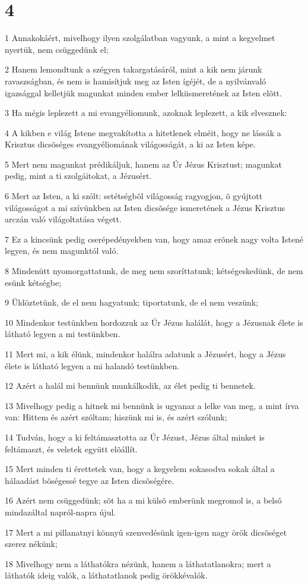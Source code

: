\chapter{4}

\par 1 Annakokáért, mivelhogy ilyen szolgálatban vagyunk, a mint a  kegyelmet nyertük, nem csüggedünk el;
\par 2 Hanem lemondtunk a szégyen takargatásáról, mint a kik nem járunk ravaszságban, és nem is hamisítjuk meg  az Isten ígéjét, de a nyilvánvaló igazsággal kelletjük magunkat minden ember lelkiismeretének az Isten elõtt.
\par 3 Ha mégis leplezett a mi evangyéliomunk, azoknak leplezett, a kik elvesznek:
\par 4 A kikben e világ Istene megvakította a hitetlenek elméit, hogy ne lássák a Krisztus dicsõséges evangyéliomának világosságát, a ki az Isten képe.
\par 5 Mert nem magunkat prédikáljuk, hanem az Úr Jézus  Krisztust; magunkat pedig, mint a ti szolgáitokat, a Jézusért.
\par 6 Mert az Isten, a ki szólt: setétségbõl világosság ragyogjon, õ gyújtott világosságot a mi  szívünkben az Isten dicsõsége ismeretének a Jézus Krisztus arczán való világoltatása végett.
\par 7 Ez a kincsünk pedig cserépedényekben van, hogy amaz erõnek nagy volta Istené legyen, és nem magunktól  való.
\par 8 Mindenütt nyomorgattatunk, de meg nem szoríttatunk; kétségeskedünk, de nem esünk  kétségbe;
\par 9 Üldöztetünk, de el nem hagyatunk; tiportatunk, de el nem veszünk;
\par 10 Mindenkor testünkben hordozzuk az Úr Jézus halálát, hogy a Jézusnak élete is látható legyen a mi testünkben.
\par 11 Mert mi, a kik élünk, mindenkor halálra adatunk a Jézusért, hogy a Jézus élete is látható legyen a mi halandó testünkben.
\par 12 Azért a halál mi bennünk munkálkodik, az élet pedig ti bennetek.
\par 13 Mivelhogy pedig a hitnek mi bennünk is ugyanaz a lelke van meg, a mint írva van: Hittem és azért szóltam; hiszünk mi is, és azért szólunk;
\par 14 Tudván, hogy a ki feltámasztotta az Úr Jézust, Jézus által minket is feltámaszt, és veletek  együtt elõállít.
\par 15 Mert minden ti érettetek van, hogy a kegyelem sokasodva sokak által a hálaadást bõségessé tegye az Isten dicsõségére.
\par 16 Azért nem csüggedünk; sõt ha a mi külsõ emberünk megromol is, a belsõ mindazáltal  napról-napra újul.
\par 17 Mert a mi pillanatnyi könnyû szenvedésünk igen-igen nagy örök  dicsõséget szerez nékünk;
\par 18 Mivelhogy nem a láthatókra nézünk, hanem a láthatatlanokra; mert a láthatók ideig valók, a láthatatlanok pedig örökkévalók.


